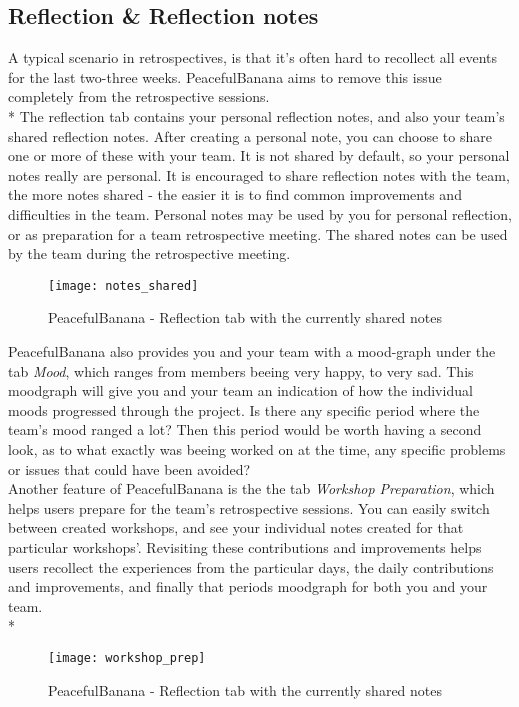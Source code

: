 %
%

\subsection{Reflection \& Reflection notes}
A typical scenario in retrospectives, is that it's often hard to recollect all events for the last two-three weeks. PeacefulBanana aims to remove this issue completely from the retrospective sessions.\\*
The reflection tab contains your personal reflection notes, and also your team's shared reflection notes. After creating a personal note, you can choose to share one or more of these with your team. It is not shared by default, so your personal notes really are personal. It is encouraged to share reflection notes with the team, the more notes shared - the easier it is to find common improvements and difficulties in the team. Personal notes may be used by you for personal reflection, or as preparation for a team retrospective meeting. The shared notes can be used by the team during the retrospective meeting.\\
\begin{figure}[h!]
\label{milestonessingular}
\centering
	\texttt{[image: notes\_shared]}
\caption{PeacefulBanana - Reflection tab with the currently shared notes}
\end{figure}
PeacefulBanana also provides you and your team with a mood-graph under the tab \textit{Mood}, which ranges from members beeing very happy, to very sad. This moodgraph will give you and your team an indication of how the individual moods progressed through the project. Is there any specific period where the team's mood ranged a lot? Then this period would be worth having a second look, as to what exactly was beeing worked on at the time, any specific problems or issues that could have been avoided?\\

Another feature of PeacefulBanana is the the tab \textit{Workshop Preparation}, which helps users prepare for the team's retrospective sessions. You can easily switch between created workshops, and see your individual notes created for that particular workshops'. Revisiting these contributions and improvements helps users recollect the experiences from the particular days, the daily contributions and improvements, and finally that periods moodgraph for both you and your team.\\*
\begin{figure}[h!]
\label{milestonessingular}
\centering
	\texttt{[image: workshop\_prep]}
\caption{PeacefulBanana - Reflection tab with the currently shared notes}
\end{figure}

